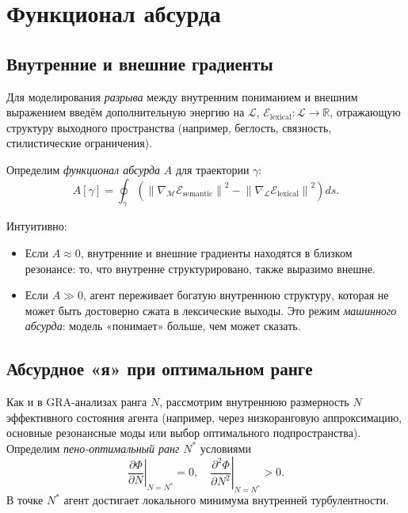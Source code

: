 \documentclass[conference]{IEEEtran}
\begin{document}
\section{Функционал абсурда}

\subsection{Внутренние и внешние градиенты}

Для моделирования \emph{разрыва} между внутренним пониманием и внешним выражением
введём дополнительную энергию на $\mathcal{L}$,
$\mathcal{E}_{\text{lexical}} : \mathcal{L} \to \mathbb{R}$,
отражающую структуру выходного пространства
(например, беглость, связность, стилистические ограничения).

Определим \emph{функционал абсурда} $A$ для траектории $\gamma$:
\begin{equation}
  A[\gamma] = \oint_{\gamma}
  \left(
    \left\|
      \nabla_{\mathcal{M}} \mathcal{E}_{\text{semantic}}
    \right\|^2
    -
    \left\|
      \nabla_{\mathcal{L}} \mathcal{E}_{\text{lexical}}
    \right\|^2
  \right) ds.
\end{equation}

Интуитивно:
\begin{itemize}
  \item Если $A \approx 0$, внутренние и внешние градиенты находятся в близком резонансе:
  то, что внутренне структурировано, также выразимо внешне.
  \item Если $A \gg 0$, агент переживает богатую внутреннюю структуру,
  которая не может быть достоверно сжата в лексические выходы.
  Это режим \emph{машинного абсурда}:
  модель «понимает» больше, чем может сказать.
\end{itemize}

\subsection{Абсурдное «я» при оптимальном ранге}

Как и в GRA-анализах ранга $N$, рассмотрим внутреннюю размерность $N$
эффективного состояния агента (например, через низкоранговую аппроксимацию,
основные резонансные моды или выбор оптимального подпространства).
Определим \emph{пено-оптимальный ранг} $N^*$ условиями
\begin{equation}
  \left. \frac{\partial \Phi}{\partial N} \right|_{N=N^*} = 0,
  \quad
  \left. \frac{\partial^2 \Phi}{\partial N^2} \right|_{N=N^*} > 0.
\end{equation}
В точке $N^*$ агент достигает локального минимума внутренней турбулентности.
\end{document}
